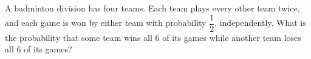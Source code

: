 A badminton division has four teams. Each team plays every other team twice, and each game is won by either team with probability $\dfrac{1}{2}$, independently. What is the probability that some team wins all $6$ of its games while another team loses all $6$ of its games?
